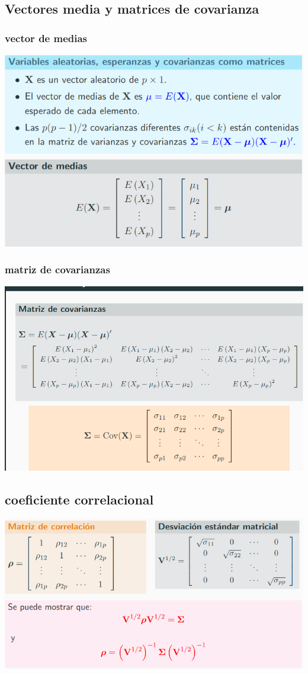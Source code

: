 \documentclass[10pt,a4paper]{article} %
\begin{document}
        \subsection{Vectores media y matrices de covarianza}
            \subsubsection{vector de medias}
                \includegraphics[width=0.8\linewidth]{vectormedias.png} 
             \subsubsection{matriz de covarianzas}
                \includegraphics[width=0.8\linewidth]{matrizcovarianzas.png}
         \subsection{coeficiente correlacional}
             \includegraphics[width=0.8\linewidth]{matrizcorrelacion.png}
            
\end{document}
